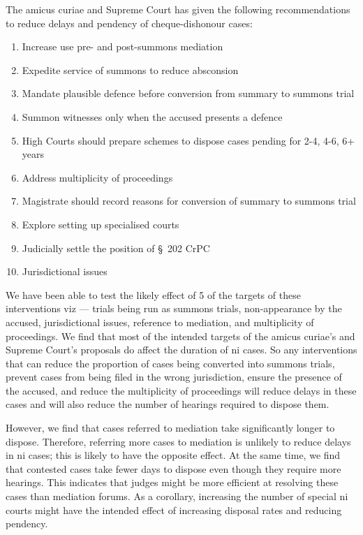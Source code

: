 The amicus curiae and Supreme Court has given the following recommendations to reduce delays and pendency of cheque-dishonour cases:
\begin{enumerate}
\item Increase use pre- and post-summons mediation
\item Expedite service of summons to reduce absconsion
\item Mandate plausible defence before conversion from summary to summons trial
\item Summon witnesses only when the accused presents a defence
\item High Courts should prepare schemes to dispose cases pending for 2-4, 4-6, 6+ years
\item Address multiplicity of proceedings
\item Magistrate should record reasons for conversion of summary to summons trial
\item Explore setting up specialised courts
\item Judicially settle the position of \S~202 CrPC
\item Jurisdictional issues
\end{enumerate}

We have been able to test the likely effect of 5 of the targets of these interventions viz --- trials being run as summons trials, non-appearance by the accused, jurisdictional issues, reference to mediation, and multiplicity of proceedings. We find that most of the intended targets of the amicus curiae's and Supreme Court's proposals do affect the duration of \gls{ni} cases. So any interventions that can reduce the proportion of cases being converted into summons trials, prevent cases from being filed in the wrong jurisdiction, ensure the presence of the accused, and reduce the multiplicity of proceedings will reduce delays in these cases and will also reduce the number of hearings required to dispose them.

However, we find that cases referred to mediation take significantly longer to dispose. Therefore, referring more cases to mediation is unlikely to reduce delays in \gls{ni} cases; this is likely to have the opposite effect. At the same time, we find that contested cases take fewer days to dispose even though they require more hearings. This indicates that judges might be more efficient at resolving these cases than mediation forums. As a corollary, increasing the number of special \gls{ni} courts might have the intended effect of increasing disposal rates and reducing pendency.


